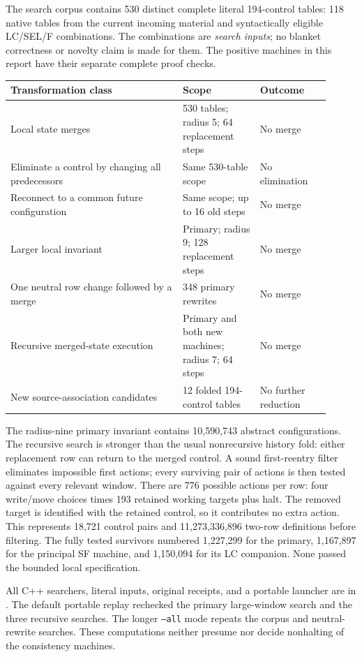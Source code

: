 \documentclass[11pt,letterpaper]{article}
\newcommand{\file}[1]{\path{#1}}
\begin{document}
The search corpus contains 530 distinct complete literal 194-control
tables: 118 native tables from the current incoming material and
syntactically eligible LC/SEL/F combinations. The combinations are
\emph{search inputs}; no blanket correctness or novelty claim is made
for them. The positive machines in this report have their separate
complete proof checks.

\begin{center}\small
\begin{tabular}{@{}p{0.49\linewidth}p{0.22\linewidth}p{0.20\linewidth}@{}}
\toprule
Transformation class & Scope & Outcome\\
\midrule
Local state merges & 530 tables; radius 5; 64 replacement steps & No merge\\
Eliminate a control by changing all predecessors & Same 530-table scope & No elimination\\
Reconnect to a common future configuration & Same scope; up to 16 old steps & No merge\\
Larger local invariant & Primary; radius 9; 128 replacement steps & No merge\\
One neutral row change followed by a merge & 348 primary rewrites & No merge\\
Recursive merged-state execution & Primary and both new machines; radius 7; 64 steps & No merge\\
New source-association candidates & 12 folded 194-control tables & No further reduction\\
\bottomrule
\end{tabular}
\end{center}

The radius-nine primary invariant contains 10,590,743 abstract
configurations. The recursive search is stronger than the usual
nonrecursive history fold: either replacement row can return to the
merged control. A sound first-reentry filter eliminates impossible first
actions; every surviving pair of actions is then tested against every
relevant window. There are 776 possible actions per row: four write/move
choices times 193 retained working targets plus halt. The removed target
is identified with the retained control, so it contributes no extra action.
This represents 18,721 control pairs and 11,273,336,896 two-row definitions
before filtering. The fully tested survivors numbered 1,227,299 for the
primary, 1,167,897 for the principal SF machine, and 1,150,094 for its LC
companion. None passed the bounded local specification.

All C++ searchers, literal inputs, original receipts, and a portable
launcher are in \file{research/physical/}. The default portable replay
rechecked the primary large-window search and the three recursive searches.
The longer \texttt{--all} mode repeats the corpus and neutral-rewrite
searches. These computations neither presume nor decide nonhalting of
the consistency machines.
\end{document}
